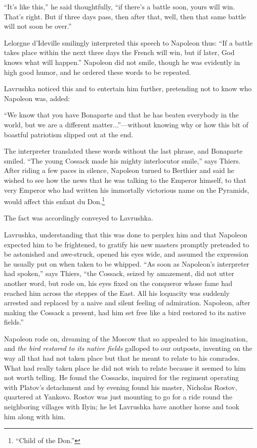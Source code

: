``It's like this,'' he said thoughtfully, ``if there's a battle
soon, yours will win. That's right. But if three days pass, then
after that, well, then that same battle will not soon be over.''

Lelorgne d'Ideville smilingly interpreted this speech to Napoleon
thus: ``If a battle takes place within the next three days the
French will win, but if later, God knows what will happen.''
Napoleon did not smile, though he was evidently in high good
humor, and he ordered these words to be repeated.

Lavrushka noticed this and to entertain him further, pretending
not to know who Napoleon was, added:

``We know that you have Bonaparte and that he has beaten
everybody in the world, but we are a different
matter...''---without knowing why or how this bit of boastful
patriotism slipped out at the end.

The interpreter translated these words without the last phrase,
and Bonaparte smiled. ``The young Cossack made his mighty
interlocutor smile,'' says Thiers. After riding a few paces in
silence, Napoleon turned to Berthier and said he wished to see
how the news that he was talking to the Emperor himself, to that
very Emperor who had written his immortally victorious name on
the Pyramids, would affect this enfant du Don.\footnote{``Child
of the Don.''}

The fact was accordingly conveyed to Lavrushka.

Lavrushka, understanding that this was done to perplex him and
that Napoleon expected him to be frightened, to gratify his new
masters promptly pretended to be astonished and awe-struck,
opened his eyes wide, and assumed the expression he usually put
on when taken to be whipped. ``As soon as Napoleon's interpreter
had spoken,'' says Thiers, ``the Cossack, seized by amazement,
did not utter another word, but rode on, his eyes fixed on the
conqueror whose fame had reached him across the steppes of the
East. All his loquacity was suddenly arrested and replaced by a
naive and silent feeling of admiration. Napoleon, after making
the Cossack a present, had him set free like a bird restored to
its native fields.''

Napoleon rode on, dreaming of the Moscow that so appealed to his
imagination, and \emph{the bird restored to its native fields}
galloped to our outposts, inventing on the way all that had not
taken place but that he meant to relate to his comrades. What had
really taken place he did not wish to relate because it seemed to
him not worth telling. He found the Cossacks, inquired for the
regiment operating with Platov's detachment and by evening found
his master, Nicholas Rostov, quartered at Yankovo. Rostov was
just mounting to go for a ride round the neighboring villages
with Ilyin; he let Lavrushka have another horse and took him
along with him.

